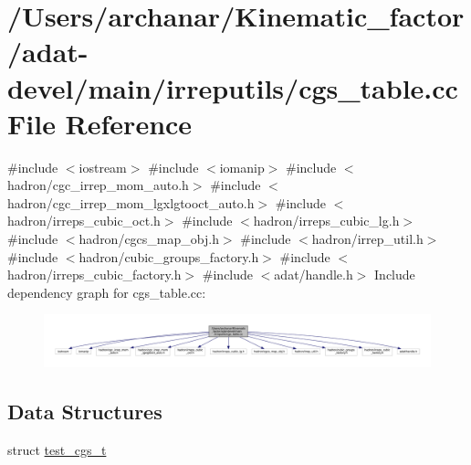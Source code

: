 \hypertarget{adat-devel_2main_2irreputils_2cgs__table_8cc}{}\section{/\+Users/archanar/\+Kinematic\+\_\+factor/adat-\/devel/main/irreputils/cgs\+\_\+table.cc File Reference}
\label{adat-devel_2main_2irreputils_2cgs__table_8cc}
{\ttfamily \#include $<$iostream$>$}\newline
{\ttfamily \#include $<$iomanip$>$}\newline
{\ttfamily \#include $<$hadron/cgc\+\_\+irrep\+\_\+mom\+\_\+auto.\+h$>$}\newline
{\ttfamily \#include $<$hadron/cgc\+\_\+irrep\+\_\+mom\+\_\+lgxlgtooct\+\_\+auto.\+h$>$}\newline
{\ttfamily \#include $<$hadron/irreps\+\_\+cubic\+\_\+oct.\+h$>$}\newline
{\ttfamily \#include $<$hadron/irreps\+\_\+cubic\+\_\+lg.\+h$>$}\newline
{\ttfamily \#include $<$hadron/cgcs\+\_\+map\+\_\+obj.\+h$>$}\newline
{\ttfamily \#include $<$hadron/irrep\+\_\+util.\+h$>$}\newline
{\ttfamily \#include $<$hadron/cubic\+\_\+groups\+\_\+factory.\+h$>$}\newline
{\ttfamily \#include $<$hadron/irreps\+\_\+cubic\+\_\+factory.\+h$>$}\newline
{\ttfamily \#include $<$adat/handle.\+h$>$}\newline
Include dependency graph for cgs\+\_\+table.\+cc\+:
\nopagebreak
\begin{figure}[H]
\begin{center}
\leavevmode
\includegraphics[width=350pt]{d3/d33/adat-devel_2main_2irreputils_2cgs__table_8cc__incl}
\end{center}
\end{figure}
\subsection*{Data Structures}
\begin{DoxyCompactItemize}
\item 
struct \mbox{\hyperlink{structtest__cgs__t}{test\+\_\+cgs\+\_\+t}}
\end{DoxyCompactItemize}
